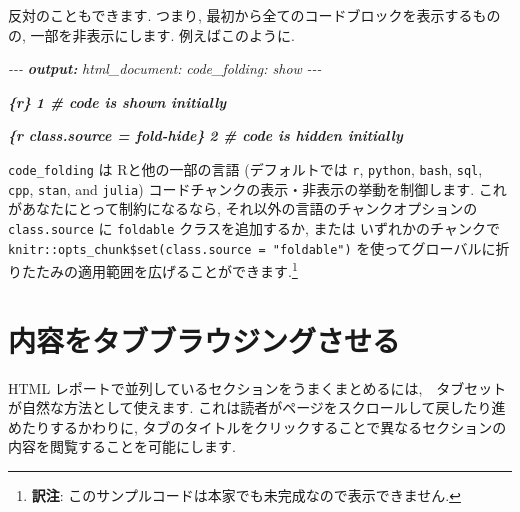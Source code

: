 \documentclass[
  11pt,
  lualatex,
  ja=standard]{bxjsreport}
\newenvironment{Shaded}{\begin{snugshade}}{\end{snugshade}}
\newcommand{\AnnotationTok}[1]{\textcolor[rgb]{0.56,0.35,0.01}{\textbf{\textit{#1}}}}
\newcommand{\CommentTok}[1]{\textcolor[rgb]{0.56,0.35,0.01}{\textit{#1}}}
\newcommand{\InformationTok}[1]{\textcolor[rgb]{0.56,0.35,0.01}{\textbf{\textit{#1}}}}
\begin{document}
反対のこともできます. つまり, 最初から全てのコードブロックを表示するものの, 一部を非表示にします. 例えばこのように.

\begin{Shaded}
\begin{Highlighting}[]
\CommentTok{{-}{-}{-}}
\AnnotationTok{output:}
\CommentTok{  html\_document:}
\CommentTok{    code\_folding: show}
\CommentTok{{-}{-}{-}}

\InformationTok{\textasciigrave{}\textasciigrave{}\textasciigrave{}\{r\}}
\InformationTok{1  \# code is shown initially}
\InformationTok{\textasciigrave{}\textasciigrave{}\textasciigrave{}}

\InformationTok{\textasciigrave{}\textasciigrave{}\textasciigrave{}\{r class.source = \textquotesingle{}fold{-}hide\textquotesingle{}\}}
\InformationTok{2  \# code is hidden initially}
\InformationTok{\textasciigrave{}\textasciigrave{}\textasciigrave{}}
\end{Highlighting}
\end{Shaded}

\texttt{code\_folding} は Rと他の一部の言語 (デフォルトでは \texttt{r}, \texttt{python}, \texttt{bash}, \texttt{sql}, \texttt{cpp}, \texttt{stan}, and \texttt{julia}) コードチャンクの表示・非表示の挙動を制御します. これがあなたにとって制約になるなら, それ以外の言語のチャンクオプションの \texttt{class.source} に \texttt{foldable} クラスを追加するか, または いずれかのチャンクで \texttt{knitr::opts\_chunk\$set(class.source = "foldable")} を使ってグローバルに折りたたみの適用範囲を広げることができます.\footnote{\textbf{訳注}: このサンプルコードは本家でも未完成なので表示できません.}

\begin{Shaded}
\begin{Highlighting}[]

\end{Highlighting}
\end{Shaded}

\hypertarget{html-tabs}{%
\section{内容をタブブラウジングさせる}\label{html-tabs}}

HTML レポートで並列しているセクションをうまくまとめるには,　タブセットが自然な方法として使えます. これは読者がページをスクロールして戻したり進めたりするかわりに, タブのタイトルをクリックすることで異なるセクションの内容を閲覧することを可能にします.
\end{document}
